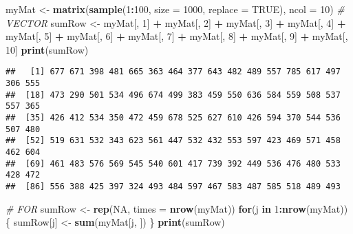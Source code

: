 \documentclass[]{book}
\newenvironment{Shaded}{\begin{snugshade}}{\end{snugshade}}
\newcommand{\KeywordTok}[1]{\textcolor[rgb]{0.13,0.29,0.53}{\textbf{#1}}}
\newcommand{\DataTypeTok}[1]{\textcolor[rgb]{0.13,0.29,0.53}{#1}}
\newcommand{\DecValTok}[1]{\textcolor[rgb]{0.00,0.00,0.81}{#1}}
\newcommand{\StringTok}[1]{\textcolor[rgb]{0.31,0.60,0.02}{#1}}
\newcommand{\CommentTok}[1]{\textcolor[rgb]{0.56,0.35,0.01}{\textit{#1}}}
\newcommand{\OtherTok}[1]{\textcolor[rgb]{0.56,0.35,0.01}{#1}}
\newcommand{\ControlFlowTok}[1]{\textcolor[rgb]{0.13,0.29,0.53}{\textbf{#1}}}
\newcommand{\OperatorTok}[1]{\textcolor[rgb]{0.81,0.36,0.00}{\textbf{#1}}}
\newcommand{\NormalTok}[1]{#1}
\theoremstyle{definition}
\theoremstyle{definition}
\theoremstyle{definition}
\theoremstyle{remark}
\begin{document}
\begin{Shaded}
\begin{Highlighting}[]
\NormalTok{myMat <-}\StringTok{ }\KeywordTok{matrix}\NormalTok{(}\KeywordTok{sample}\NormalTok{(}\DecValTok{1}\OperatorTok{:}\DecValTok{100}\NormalTok{, }\DataTypeTok{size =} \DecValTok{1000}\NormalTok{, }\DataTypeTok{replace =} \OtherTok{TRUE}\NormalTok{), }\DataTypeTok{ncol =} \DecValTok{10}\NormalTok{)}
\CommentTok{# VECTOR}
\NormalTok{sumRow <-}\StringTok{ }\NormalTok{myMat[, }\DecValTok{1}\NormalTok{] }\OperatorTok{+}\StringTok{ }\NormalTok{myMat[, }\DecValTok{2}\NormalTok{] }\OperatorTok{+}\StringTok{ }\NormalTok{myMat[, }\DecValTok{3}\NormalTok{] }\OperatorTok{+}\StringTok{ }\NormalTok{myMat[, }\DecValTok{4}\NormalTok{] }\OperatorTok{+}\StringTok{ }
\StringTok{  }\NormalTok{myMat[, }\DecValTok{5}\NormalTok{] }\OperatorTok{+}\StringTok{ }\NormalTok{myMat[, }\DecValTok{6}\NormalTok{] }\OperatorTok{+}\StringTok{ }\NormalTok{myMat[, }\DecValTok{7}\NormalTok{] }\OperatorTok{+}\StringTok{ }\NormalTok{myMat[, }\DecValTok{8}\NormalTok{] }\OperatorTok{+}\StringTok{ }
\StringTok{  }\NormalTok{myMat[, }\DecValTok{9}\NormalTok{] }\OperatorTok{+}\StringTok{ }\NormalTok{myMat[, }\DecValTok{10}\NormalTok{]}
\KeywordTok{print}\NormalTok{(sumRow)}
\end{Highlighting}
\end{Shaded}

\begin{verbatim}
##   [1] 677 671 398 481 665 363 464 377 643 482 489 557 785 617 497 306 555
##  [18] 473 290 501 534 496 674 499 383 459 550 636 584 559 508 537 557 365
##  [35] 426 412 534 350 472 459 678 525 627 610 426 594 370 544 536 507 480
##  [52] 519 631 532 343 623 561 447 532 432 553 597 423 469 571 458 462 604
##  [69] 461 483 576 569 545 540 601 417 739 392 449 536 476 480 533 428 472
##  [86] 556 388 425 397 324 493 484 597 467 583 487 585 518 489 493
\end{verbatim}

\begin{Shaded}
\begin{Highlighting}[]
\CommentTok{# FOR}
\NormalTok{sumRow <-}\StringTok{ }\KeywordTok{rep}\NormalTok{(}\OtherTok{NA}\NormalTok{, }\DataTypeTok{times =} \KeywordTok{nrow}\NormalTok{(myMat))}
\ControlFlowTok{for}\NormalTok{(j }\ControlFlowTok{in} \DecValTok{1}\OperatorTok{:}\KeywordTok{nrow}\NormalTok{(myMat))\{}
\NormalTok{  sumRow[j] <-}\StringTok{ }\KeywordTok{sum}\NormalTok{(myMat[j, ])}
\NormalTok{\}}
\KeywordTok{print}\NormalTok{(sumRow)}
\end{Highlighting}
\end{Shaded}
\end{document}
